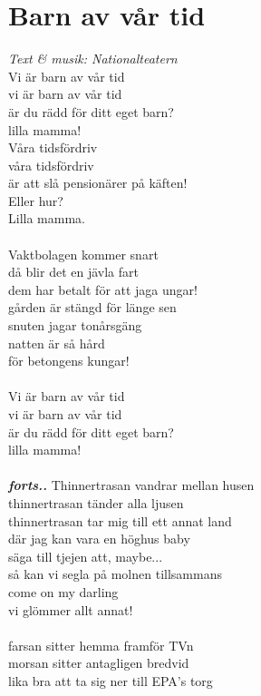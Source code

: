 \section{Barn av vår tid}
\textit{Text \& musik: Nationalteatern}
\vspace{2mm}\\
Vi är barn av vår tid\\
vi är barn av vår tid\\
är du rädd för ditt eget barn?\\
lilla mamma!\\
Våra tidsfördriv\\
våra tidsfördriv\\
är att slå pensionärer på käften!\\
Eller hur?\\
Lilla mamma.\\
\\
Vaktbolagen kommer snart\\
då blir det en jävla fart\\
dem har betalt för att jaga ungar!\\
gården är stängd för länge sen\\
snuten jagar tonårsgäng\\
natten är så hård\\
för betongens kungar!\\
\\
Vi är barn av vår tid\\
vi är barn av vår tid\\
är du rädd för ditt eget barn?\\
lilla mamma!\\
\\
\textbf{\textit{forts..}}
\newpage
\noindent Thinnertrasan vandrar mellan husen\\
thinnertrasan tänder alla ljusen\\
thinnertrasan tar mig till ett annat land\\
där jag kan vara en höghus baby\\
säga till tjejen att, maybe...\\
så kan vi segla på molnen tillsammans\\
come on my darling\\
vi glömmer allt annat!\\
\\
farsan sitter hemma framför TVn\\
morsan sitter antagligen bredvid\\
lika bra att ta sig ner till EPA's torg\\
